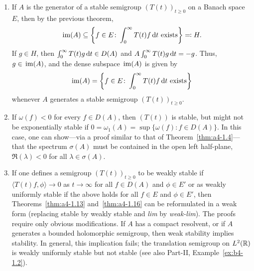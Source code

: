 \begin{remark}\label{rem:a4-1.17}
\begin{enumerate}[\upshape (i), wide, labelindent=.25em]
\item 
If\/ $A$ is the generator of a stable semigroup
$(T(t))_{t \geq 0}$ on a Banach space $E$, then by the previous theorem,
\[{
\mathop{}\mathrm{im}(A) \subseteq \left\{f \in E\colon\int_{0}^{\infty} T(t)f  \mathop{}\!\mathrm{d}{t} 
\text{ exists} \right\}  \eqqcolon  H .
}
\]
If\/ $g \in H$, then $\int_{0}^{\infty} T(t)g  \mathop{}\!\mathrm{d}{t} \in D(A)$ and $A \int_{0}^{\infty} T(t)g  \mathop{}\!\mathrm{d}{t} = -g$. 
Thus, $g \in \mathop{}\mathrm{im}(A)$, and  the dense subspace $\mathop{}\mathrm{im}(A)$ is given
by
\begin{equation}\label{eq:a4-1.14}
\mathop{}\mathrm{im}(A) = \left\{f \in E\colon\int_{0}^{\infty} T(t)f  \mathop{}\!\mathrm{d}{t} \text{ exists} \right\}
\end{equation}
whenever $A$ generates a stable semigroup $(T(t))_{t \geq 0}$.

\item 
If\/ $\omega(f) < 0$ for every $f \in D(A)$, then $(T(t))$ is stable, but
might not be exponentially stable if
$0 = \omega_{1}(A) = \sup\{\omega(f) \colon f \in D(A)\}$.
In this case, one can show---via a
proof similar to that of Theorem~\ref{thm:a4-1.4}---that the spectrum $\sigma(A)$ must be contained
in the open left half-plane, \ie $\Re(\lambda) < 0$ for all $\lambda \in \sigma(A)$.

\item 
If one defines a semigroup $(T(t))_{t \geq 0}$ to be weakly stable if
$\langle T(t)f,\phi \rangle \to 0$ as $t \to \infty$ for all $f \in D(A)$ and $\phi \in E'$ or as
weakly uniformly stable if the above holds  for all $f \in E$
and $\phi \in E'$, then Theorems~\ref{thm:a4-1.13} and~\ref{thm:a4-1.16} can be reformulated in a weak form (\ie  replacing stable by weakly stable and \emph{lim} by
\emph{weak-lim}). 
The proofs require only obvious modifications.
If $A$ has a compact resolvent, or if $A$ generates a bounded
holomorphic semigroup, then weak stability implies stability. 
In general, this implication fails; \eg the translation semigroup on
$L^{2}(\mathbb{R})$ is weakly uniformly stable but not stable (see also Part-II, Example~\ref{ex:b4-1.2}).
\end{enumerate}
\end{remark}
